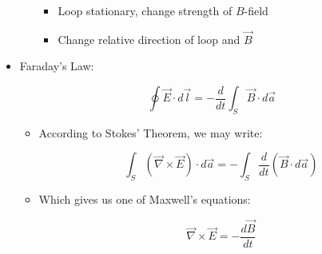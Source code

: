 \begin{itemize}
\begin{itemize}
\begin{itemize}
          \item Loop stationary, change strength of $B$-field

          \item Change relative direction of loop and $\vec{B}$

        \end{itemize}

    \end{itemize}

  \item Faraday's Law:

    $$\oint\vec{E}\cdot d\vec{l}=-\frac{d}{dt}\int_S\vec{B}\cdot d\vec{a}$$

    \begin{itemize}

      \item According to Stokes' Theorem, we may write:

        $$\int_S(\vec{\nabla}\times\vec{E})\cdot d\vec{a}=-\int_S\frac{d}{dt}(\vec{B}\cdot d\vec{a})$$

      \item Which gives us one of Maxwell's equations:

        $$\vec{\nabla}\times\vec{E}=-\frac{d\vec{B}}{dt}$$

    \end{itemize}

\end{itemize}



